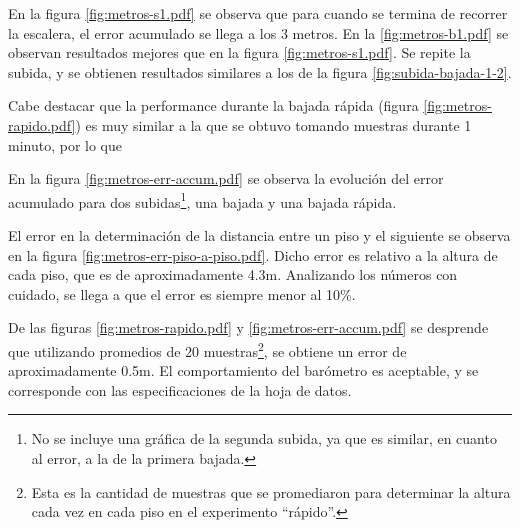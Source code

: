 \documentclass[main]{subfiles}
\begin{document}
En la figura \ref{fig:metros-s1.pdf} se observa que para cuando se termina de recorrer la escalera, el error acumulado se llega a los 3 metros. En la \ref{fig:metros-b1.pdf} se observan resultados mejores que en la figura \ref{fig:metros-s1.pdf}. Se repite la subida, y se obtienen resultados similares a los de la figura \ref{fig:subida-bajada-1-2}.

Cabe destacar que la performance durante la bajada r\'apida (figura \ref{fig:metros-rapido.pdf}) es muy similar a la que se obtuvo tomando muestras durante 1 minuto, por lo que 

En la figura \ref{fig:metros-err-accum.pdf} se observa la evoluci\'on del error acumulado para dos subidas\footnote{No se incluye una gr\'afica de la segunda subida, ya que es similar, en cuanto al error, a la de la primera bajada.}, una bajada y una bajada r\'apida.

El error en la determinaci\'on de la distancia entre un piso y el siguiente se observa en la figura \ref{fig:metros-err-piso-a-piso.pdf}. Dicho error es relativo a la altura de cada piso, que es de aproximadamente 4.3m. Analizando los n\'umeros con cuidado, se llega a que el error es siempre menor al 10\%.

De las figuras \ref{fig:metros-rapido.pdf} y \ref{fig:metros-err-accum.pdf} se desprende que utilizando promedios de 20 muestras\footnote{Esta es la cantidad de muestras que se promediaron para determinar la altura cada vez en cada piso en el experimento ``r\'apido''.}, se obtiene un error de aproximadamente 0.5m. El comportamiento del bar\'ometro es aceptable, y se corresponde con las especificaciones de la hoja de datos.
\end{document}
